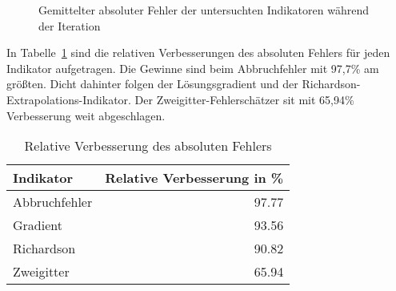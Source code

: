 \begin{figure}[h]
\centering
{}
\caption{Gemittelter absoluter Fehler der untersuchten Indikatoren während der Iteration}
\end{figure}
\noindent
In Tabelle~\ref{tab:verb} sind die relativen Verbesserungen des absoluten Fehlers für jeden
Indikator aufgetragen. Die Gewinne sind beim Abbruchfehler mit 97,7\% am größten.
Dicht dahinter folgen der Lösungsgradient und der Richardson-Extrapolations-Indikator.
Der Zweigitter-Fehlerschätzer sit mit 65,94\% Verbesserung weit abgeschlagen.

\begin{table}[h]
  \begin{tabular}{l r}
  \toprule
  Indikator & Relative Verbesserung in \% \\
  \midrule
      Abbruchfehler & 97.77\\
      Gradient & 93.56\\
      Richardson & 90.82\\
      Zweigitter & 65.94\\
  \bottomrule
\end{tabular}
\caption{Relative Verbesserung des absoluten Fehlers}
\label{tab:verb}
\end{table}


